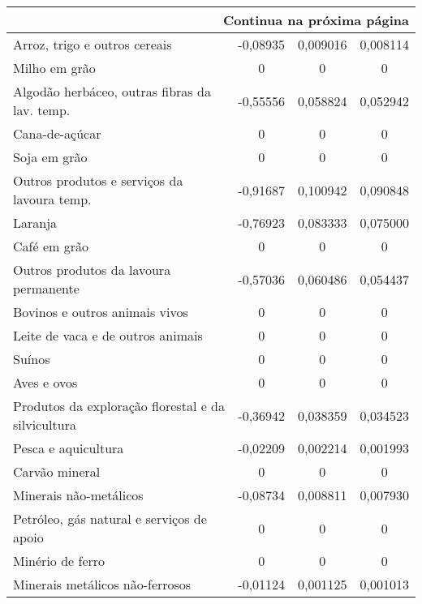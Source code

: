 \begin{apendicesenv}
\begin{small}
\begin{center}
\begin{longtable}{m{8cm}ccc}
				\hline \multicolumn{4}{r}{{Continua na próxima página}} \\ \hline
				\endfoot

				\hline \endlastfoot

				Arroz, trigo e outros cereais                      & -0,08935 & 0,009016 & 0,008114 \\
				Milho em grão                                      & 0 & 0 & 0 \\
				Algodão herbáceo, outras fibras da lav. temp.      & -0,55556 & 0,058824 & 0,052942 \\
				Cana-de-açúcar                                     & 0 & 0 & 0 \\
				Soja  em grão                                      & 0 & 0 & 0 \\
				Outros produtos e serviços da lavoura temp.        & -0,91687 & 0,100942 & 0,090848 \\
				Laranja                                            & -0,76923 & 0,083333 & 0,075000 \\
				Café em grão                                       & 0 & 0 & 0 \\
				Outros produtos da lavoura permanente              & -0,57036 & 0,060486 & 0,054437 \\
				Bovinos e outros animais vivos                     & 0 & 0 & 0 \\
				Leite de vaca e de outros animais                  & 0 & 0 & 0 \\
				Suínos                                             & 0 & 0 & 0 \\
				Aves e ovos                                        & 0 & 0 & 0 \\
				Produtos da exploração florestal e da silvicultura & -0,36942 & 0,038359 & 0,034523 \\
				Pesca e aquicultura                                & -0,02209 & 0,002214 & 0,001993 \\
				Carvão mineral                                     & 0 & 0 & 0 \\
				Minerais não-metálicos                             & -0,08734 & 0,008811 & 0,007930 \\
				Petróleo, gás natural e   serviços de apoio        & 0 & 0 & 0 \\
				Minério de ferro                                   & 0 & 0 & 0 \\
				Minerais metálicos não-ferrosos                    & -0,01124 & 0,001125 & 0,001013 \\

\end{longtable}
\end{center}
\end{small}
\end{apendicesenv}
